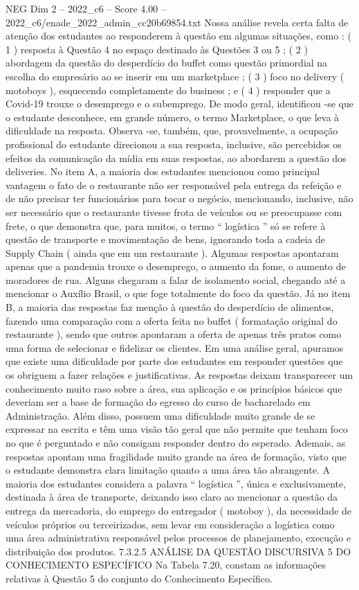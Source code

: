 \begin{textsample}{NEG Dim 2 – 2022\_c6 – Score 4.00 – 2022\_c6/enade\_2022\_admin\_cc20b69854.txt}
Nossa análise revela certa falta de atenção dos estudantes ao responderem à questão em algumas situações, como : ( 1 ) resposta à Questão 4 no espaço destinado às Questões 3 ou 5 ; ( 2 ) abordagem da questão do desperdício do buffet como questão primordial na escolha do empresário ao se inserir em um marketplace ; ( 3 ) foco no delivery ( motoboys ), esquecendo completamente do business ; e ( 4 ) responder que a Covid-19 trouxe o desemprego e o subemprego.
De modo geral, identificou -se que o estudante desconhece, em grande número, o termo Marketplace, o que leva à dificuldade na resposta.
Observa -se, também, que, provavelmente, a ocupação profissional do estudante direcionou a sua resposta, inclusive, são percebidos os efeitos da comunicação da mídia em suas respostas, ao abordarem a questão dos deliveries.
No item A, a maioria dos estudantes mencionou como principal vantagem o fato de o restaurante não ser responsável pela entrega da refeição e de não precisar ter funcionários para tocar o negócio, mencionando, inclusive, não ser necessário que o restaurante tivesse frota de veículos ou se preocupasse com frete, o que demonstra que, para muitos, o termo “ logística ” só se refere à questão de transporte e movimentação de bens, ignorando toda a cadeia de Supply Chain ( ainda que em um restaurante ).
Algumas respostas apontaram apenas que a pandemia trouxe o desemprego, o aumento da fome, o aumento de moradores de rua.
Alguns chegaram a falar de isolamento social, chegando até a mencionar o Auxílio Brasil, o que foge totalmente do foco da questão.
Já no item B, a maioria das respostas faz menção à questão do desperdício de alimentos, fazendo uma comparação com a oferta feita no buffet ( formatação original do restaurante ), sendo que outros apontaram a oferta de apenas três pratos como uma forma de selecionar e fidelizar os clientes.
Em uma análise geral, apuramos que existe uma dificuldade por parte dos estudantes em responder questões que os obriguem a fazer relações e justificativas.
As respostas deixam transparecer um conhecimento muito raso sobre a área, sua aplicação e os princípios básicos que deveriam ser a base de formação do egresso do curso de bacharelado em Administração.
Além disso, possuem uma dificuldade muito grande de se expressar na escrita e têm uma visão tão geral que não permite que tenham foco no que é perguntado e não consigam responder dentro do esperado.
Ademais, as respostas apontam uma fragilidade muito grande na área de formação, visto que o estudante demonstra clara limitação quanto a uma área tão abrangente.
A maioria dos estudantes considera a palavra “ logística ”, única e exclusivamente, destinada à área de transporte, deixando isso claro ao mencionar a questão da entrega da mercadoria, do emprego do entregador ( motoboy ), da necessidade de veículos próprios ou terceirizados, sem levar em consideração a logística como uma área administrativa responsável pelos processos de planejamento, execução e distribuição dos produtos. 7.3.2.5 ANÁLISE DA QUESTÃO DISCURSIVA 5 DO CONHECIMENTO ESPECÍFICO Na Tabela 7.20, constam as informações relativas à Questão 5 do conjunto do Conhecimento Específico.

\end{textsample}
